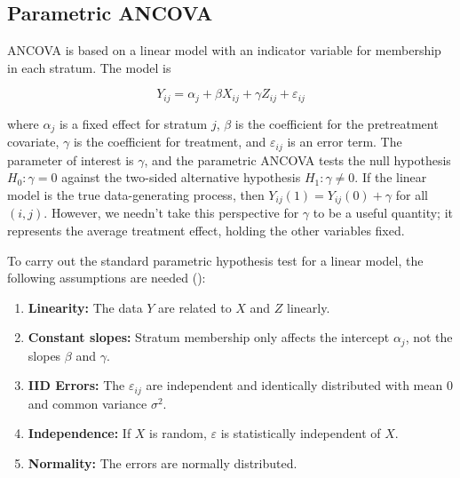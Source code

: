 \documentclass[12pt]{article}
\newcommand{\todo}[1]{{\color{red}{TO DO: \sc #1}}}
\begin{document}
\subsection{Parametric ANCOVA}\label{subsec:ancova}

ANCOVA is based on a linear model with an indicator variable for membership in each stratum.
The model is

\begin{equation}\label{eqn:ancova}
Y_{ij} = \alpha_j + \beta X_{ij} + \gamma Z_{ij} + \varepsilon_{ij}
\end{equation}

\noindent where $\alpha_j$ is a fixed effect for stratum $j$, $\beta$ is the coefficient for the pretreatment covariate,
$\gamma$ is the coefficient for treatment,
and $\varepsilon_{ij}$ is an error term.
The parameter of interest is $\gamma$, and the parametric ANCOVA tests the null hypothesis $H_0: \gamma = 0$ against
the two-sided alternative hypothesis $H_1: \gamma \neq 0$.
If the linear model is the true data-generating process, then $Y_{ij}(1) = Y_{ij}(0) + \gamma$ for all $(i, j)$.
However, we needn't take this perspective for $\gamma$ to be a useful quantity; it represents the average treatment effect, holding the other variables fixed.



To carry out the standard parametric hypothesis test for a linear model, the following assumptions are needed (\cite{freedman_statistical_2005}):
\todo{CHECK}
\begin{enumerate}
\item \textbf{Linearity:} The data $Y$ are related to $X$ and $Z$ linearly.
\item \textbf{Constant slopes:} Stratum membership only affects the intercept $\alpha_j$, not the slopes $\beta$ and $\gamma$.
\item \textbf{IID Errors:} The $\varepsilon_{ij}$ are independent and identically distributed with mean $0$ and common variance $\sigma^2$.
\item \textbf{Independence:} If $X$ is random, $\varepsilon$ is statistically independent of $X$.
\item \textbf{Normality:} The errors are normally distributed.
\end{enumerate}
\end{document}
